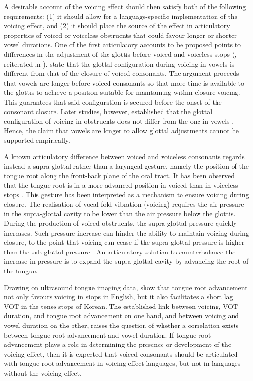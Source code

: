 \documentclass[authoryear, twocolumn]{elsarticle}
\begin{document}
A desirable account of the voicing effect should then satisfy both of
the following requirements: (1) it should allow for a language-specific
implementation of the voicing effect, and (2) it should place the source
of the effect in articulatory properties of voiced or voiceless
obstruents that could favour longer or shorter vowel durations. One of
the first articulatory accounts to be proposed points to differences in
the adjustment of the glottis before voiced and voiceless stops
(\citealt{halle1967}, reiterated in \citealt{chomsky1968}).
\citet{halle1967} state that the glottal configuration during voicing in
vowels is different from that of the closure of voiced consonants. The
argument proceeds that vowels are longer before voiced consonants so
that more time is available to the glottis to achieve a position
suitable for maintaining within-closure voicing. This guarantees that
said configuration is secured before the onset of the consonant closure.
Later studies, however, established that the glottal configuration of
voicing in obstruents does not differ from the one in vowels
\citep{lisker1974,kagaya1975}. Hence, the claim that vowels are longer
to allow glottal adjustments cannot be supported empirically.

A known articulatory difference between voiced and voiceless consonants
regards instead a supra-glottal rather than a laryngeal gesture, namely
the position of the tongue root along the front-back plane of the oral
tract. It has been observed that the tongue root is in a more advanced
position in voiced than in voiceless stops
\citep{kent1969,perkell1969,westbury1983}. This gesture has been
interpreted as a mechanism to ensure voicing during closure. The
realisation of vocal fold vibration (voicing) requires the air pressure
in the supra-glottal cavity to be lower than the air pressure below the
glottis. During the production of voiced obstruents, the supra-glottal
pressure quickly increases. Such pressure increase can hinder the
ability to maintain voicing during closure, to the point that voicing
can cease if the supra-glottal pressure is higher than the sub-glottal
pressure \citep{ohala2011}. An articulatory solution to counterbalance
the increase in pressure is to expand the supra-glottal cavity by
advancing the root of the tongue.

Drawing on ultrasound tongue imaging data, \citet{ahn2016} show that
tongue root advancement not only favours voicing in stops in English,
but it also facilitates a short lag VOT in the tense stops of Korean.
The established link between voicing, VOT duration, and tongue root
advancement on one hand, and between voicing and vowel duration on the
other, raises the question of whether a correlation exists between
tongue root advancement and vowel duration. If tongue root advancement
plays a role in determining the presence or development of the voicing
effect, then it is expected that voiced consonants should be articulated
with tongue root advancement in voicing-effect languages, but not in
languages without the voicing effect.
\end{document}
